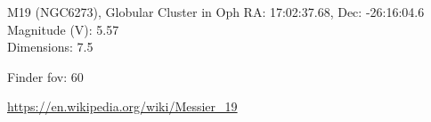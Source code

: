\begin{block}{M19 (NGC6273), Globular Cluster in Oph}
    RA: 17:02:37.68, Dec: -26:16:04.6 \\ 
    Magnitude (V): 5.57 \\ 
    Dimensions: 7.5 

    Finder fov: 60 

    \url{https://en.wikipedia.org/wiki/Messier_19} 
\end{block}